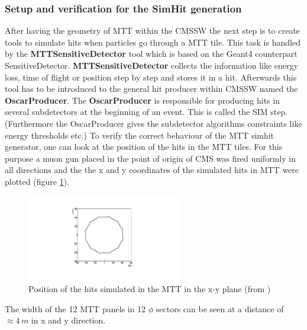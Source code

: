 		\subsubsection{Setup and verification for the SimHit generation}
			After having the geometry of MTT within the CMSSW the next step is to create tools to simulate hits when particles go through a MTT tile.
			This task is handled by the \textbf{MTTSensitiveDetector} tool which is based on the Geant4 counterpart SensitiveDetector.
			\textbf{MTTSensitiveDetector} collects the information like energy loss, time of flight or position step by step and stores it in a hit.
			Afterwards this tool has to be introduced to the general hit producer within CMSSW named the \textbf{OscarProducer}.
			The \textbf{OscarProducer} is responsible for producing hits in several subdetectors at the beginning of an event.
			This is called the SIM step.
			(Furthermore the OscarProducer gives the subdetector algorithms constraints like energy thresholds etc.)
			To verify the correct behaviour of the MTT simhit generator, one can look at the position of the hits in the MTT tiles.
			For this purpose a muon gun placed in the point of origin of CMS was fired uniformly in all directions and the the x and y coordinates of the simulated hits in MTT were plotted (figure
			\ref{fig:hitpos_mtt}).
			\begin{figure}[htbp]
				\centering
				\includegraphics[width=0.6\textwidth]{Figures/erdogan/hitpos_mtt.png}
				\caption{Position of the hits simulated in the MTT in the x-y plane (from \cite{paul_thesis})}
				\label{fig:hitpos_mtt}
			\end{figure}
			The width of the 12 MTT panels in 12 $\phi$ sectors can be seen at a distance of $\approx4\,m$ in x and y direction.
